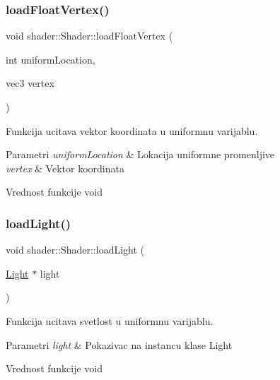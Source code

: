 \subsubsection{\texorpdfstring{load\+Float\+Vertex()}{loadFloatVertex()}}
{\footnotesize\ttfamily void shader\+::\+Shader\+::load\+Float\+Vertex (\begin{DoxyParamCaption}\item[{int}]{uniform\+Location,  }\item[{vec3}]{vertex }\end{DoxyParamCaption})}



Funkcija ucitava vektor koordinata u uniformnu varijablu. 


\begin{DoxyParams}{Parametri}
{\em uniform\+Location} & Lokacija uniformne promenljive \\
\hline
{\em vertex} & Vektor koordinata \\
\hline
\end{DoxyParams}
\begin{DoxyReturn}{Vrednost funkcije}
void 
\end{DoxyReturn}
\mbox{\label{classshader_1_1Shader_abe287aa3d352de4e8aac6677666b90d1}} 
\subsubsection{\texorpdfstring{load\+Light()}{loadLight()}}
{\footnotesize\ttfamily void shader\+::\+Shader\+::load\+Light (\begin{DoxyParamCaption}\item[{\hyperlink{classentity_1_1Light}{Light} $\ast$}]{light }\end{DoxyParamCaption})}



Funkcija ucitava svetlost u uniformnu varijablu. 


\begin{DoxyParams}{Parametri}
{\em light} & Pokazivac na instancu klase Light \\
\hline
\end{DoxyParams}
\begin{DoxyReturn}{Vrednost funkcije}
void 
\end{DoxyReturn}
\mbox{\label{classshader_1_1Shader_ac2d90fdd4dfb7077046ec35b050660ee}} 
